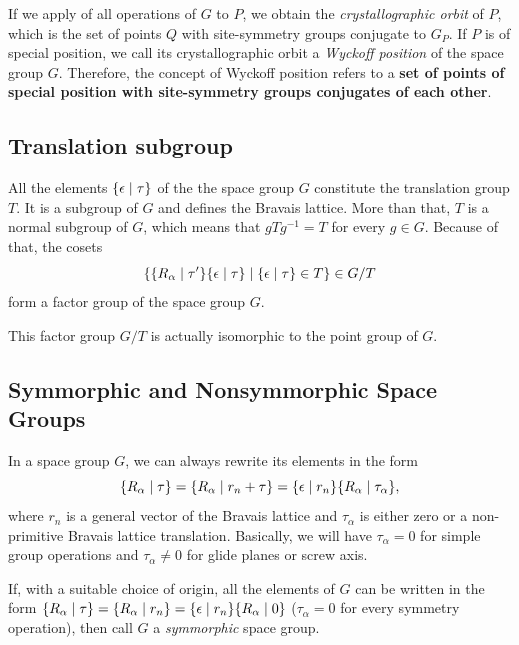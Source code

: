 If we apply of all operations of $G$ to $P$, we obtain the \textit{crystallographic orbit} of $P$, which is the set of points $Q$ with site-symmetry groups conjugate to $G_P$. If $P$ is of special position, we call its crystallographic orbit a \textit{Wyckoff position} of the space group $G$. Therefore, the concept of Wyckoff position refers to a \textbf{set of points of special position with site-symmetry groups conjugates of each other}.

\subsection{Translation subgroup}

All the elements $\{ \epsilon \mid \tau \}$ of the the space group $G$ constitute the translation group $T$. It is a subgroup of $G$ and defines the Bravais lattice. More than that, $T$ is a normal subgroup of $G$, which means that $g T g^{-1} = T$ for every $g \in G$. Because of that, the cosets
$$
\{ \{ R_\alpha \mid \tau' \} \{ \epsilon \mid \tau \} \mid \{ \epsilon \mid \tau \} \in T \} \in G/T
$$
form a factor group of the space group $G$.

This factor group $G/T$ is actually isomorphic to the point group of $G$.

\subsection{Symmorphic and Nonsymmorphic Space Groups}

In a space group $G$, we can always rewrite its elements in the form
$$
\{ R_\alpha \mid \tau \} = \{ R_\alpha \mid r_n + \tau \} = \{ \epsilon \mid r_n \} \{ R_\alpha \mid \tau_\alpha \},
$$
where $r_n$ is a general vector of the Bravais lattice and $\tau_\alpha$ is either zero or a non-primitive Bravais lattice translation. Basically, we will have $\tau_\alpha = 0$ for simple group operations and $\tau_\alpha \neq 0$ for glide planes or screw axis.

If, with a suitable choice of origin, all the elements of $G$ can be written in the form $\{ R_\alpha \mid \tau \} = \{ R_\alpha \mid r_n \} = \{ \epsilon \mid r_n \} \{ R_\alpha \mid 0 \}$ ($\tau_\alpha = 0$ for every symmetry operation), then call $G$ a \textit{symmorphic} space group.


